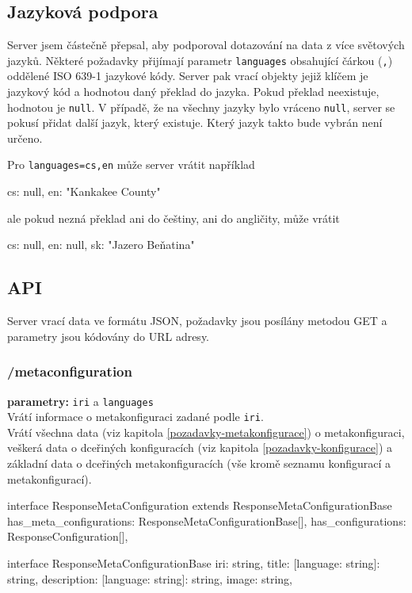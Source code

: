 \subsection{Jazyková podpora} \label{jazykova-podpora}
Server jsem částečně přepsal, aby podporoval dotazování na data z více světových jazyků. Některé požadavky přijímají parametr \texttt{languages} obsahující čárkou (\texttt{,}) oddělené ISO 639-1 jazykové kódy. Server pak vrací objekty jejiž klíčem je jazykový kód a hodnotou daný překlad do jazyka. Pokud překlad neexistuje, hodnotou je \texttt{null}. V případě, že na všechny jazyky bylo vráceno \texttt{null}, server se pokusí přidat další jazyk, který existuje. Který jazyk takto bude vybrán není určeno.

\begin{prikl}
Pro \texttt{languages=cs,en} může server vrátit například
\begin{code}[frame=none]
{
    cs: null,
    en: "Kankakee County"
}
\end{code}
ale pokud nezná překlad ani do češtiny, ani do angličity, může vrátit
\begin{code}[frame=none]
{
    cs: null,
    en: null,
    sk: "Jazero Beňatina"
}
\end{code}
\end{prikl}

\subsection{API}
Server vrací data ve formátu JSON, požadavky jsou posílány metodou GET a parametry jsou kódovány do URL adresy.

\subsubsection{/metaconfiguration}
\textbf{parametry:} \texttt{iri} a \texttt{languages} \\
Vrátí informace o metakonfiguraci zadané podle \texttt{iri}. \\
Vrátí všechna data (viz kapitola \ref{pozadavky-metakonfigurace}) o metakonfiguraci, veškerá data o dceřiných konfiguracích (viz kapitola \ref{pozadavky-konfigurace}) a základní data o dceřiných metakonfiguracích (vše kromě seznamu konfigurací a metakonfigurací).

\begin{code}
interface ResponseMetaConfiguration extends
ResponseMetaConfigurationBase {
    has_meta_configurations: ResponseMetaConfigurationBase[],
    has_configurations: ResponseConfiguration[],
}

interface ResponseMetaConfigurationBase {
    iri: string,
    title: {[language: string]: string},
    description: {[language: string]: string},
    image: string,
}
\end{code}

